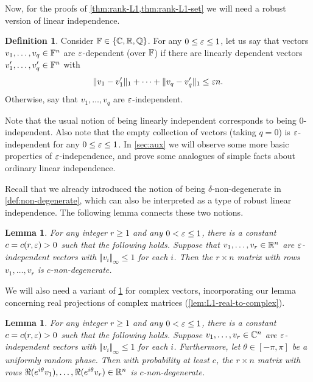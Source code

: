 \documentclass{daj}
\theoremstyle{plain}
\theoremstyle{plain}
\newtheorem{lem}[thm]{Lemma}
\theoremstyle{plain}
\theoremstyle{plain}
\theoremstyle{definition}
\newtheorem{defn}[thm]{Definition}
\theoremstyle{plain}
\theoremstyle{plain}
\theoremstyle{definition}
\theoremstyle{definition}
\theoremstyle{plain}
\begin{document}
Now, for the proofs of \cref{thm:rank-L1,thm:rank-L1-set} we will need a robust version of linear independence.

\begin{defn}\label{def:eps-independence}
Consider $\mathbb{F}\in \lbrace \mathbb{C},\mathbb{R}, \mathbb{Q}\rbrace$. For any $0\leq \varepsilon\leq 1$, let us say that vectors $v_1,\dots,v_q\in \mathbb{F}^n$ are $\varepsilon$-dependent (over $\mathbb{F}$) if there are linearly dependent vectors $v_1',\dots,v_q'\in \mathbb{F}^n$ with
\begin{equation*}
\Vert v_1-v_1'\Vert_1+\dots +\Vert v_q-v_q'\Vert_1\leq \varepsilon n.
\end{equation*}
Otherwise, say that $v_1,\dots,v_q$ are $\varepsilon$-independent.
\end{defn}

Note that the usual notion of being linearly independent corresponds to being 0-independent. Also note that the empty collection of vectors (taking $q=0$) is $\varepsilon$-independent for any $0\leq \varepsilon\leq 1$. In \cref{sec:aux} we will observe some more basic properties of $\varepsilon$-independence, and prove some analogues of simple facts about ordinary linear independence.

Recall that we already introduced the notion of being $\delta$-non-degenerate in \cref{def:non-degenerate}, which can also be interpreted as a type of robust linear independence. The following lemma connects these two notions.

\begin{lem}\label{lem-independent-non-degenerate-real}
For any integer $r\geq 1$ and any $0<\varepsilon\leq 1$, there is a constant $c=c(r,\varepsilon)>0$ such that the following holds. Suppose that $v_1,\dots,v_r\in \mathbb{R}^n$ are $\varepsilon$-independent vectors with $\Vert v_i\Vert_\infty\le 1$ for each $i$. Then the $r\times n$ matrix with rows $v_1,\dots,v_r$ is $c$-non-degenerate.
\end{lem}

We will also need a variant of \cref{lem-independent-non-degenerate-real} for complex vectors, incorporating our lemma concerning real projections of complex matrices (\cref{lem:L1-real-to-complex}).

\begin{lem}\label{lem-independent-non-degenerate-complex}
For any integer $r\geq 1$ and any $0<\varepsilon\leq 1$, there is a constant $c=c(r,\varepsilon)>0$ such that the following holds. Suppose $v_1,\dots,v_r\in \mathbb{C}^n$ are $\varepsilon$-independent vectors with $\Vert v_i\Vert_\infty\le 1$ for each $i$. Furthermore, let $\theta\in [-\pi, \pi]$ be a uniformly random phase. Then with probability at least $c$, the $r\times n$ matrix with rows $\Re(e^{i\theta}v_1),\dots,\Re(e^{i\theta}v_r)\in \mathbb{R}^n$ is $c$-non-degenerate.
\end{lem}
\end{document}
